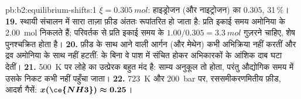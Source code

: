 \begin{solution}{pb:b2:equilibrium-shifts:1}
$\xi = \qty{0.305}{mol}$: हाइड्रोजन (और नाइट्रोजन) का 
$0.305$, 31\,\%।
\textbf{19.} स्थायी संचालन में सारा ताज़ा फ़ीड अंततः रूपांतरित हो जाता है:
प्रति इकाई समय अमोनिया के \qty{2.00}{mol} निकलते हैं; परिवर्तक से प्रति इकाई समय  के $1.00/
0.305 = \qty{3.3}{mol}$ गुज़रने चाहिए, शेष पुनश्चक्रित होता है।
\textbf{20.} फ़ीड के साथ आने वाली आर्गन (और मेथेन) कभी अभिक्रिया नहीं करतीं और
द्रव अमोनिया के साथ नहीं हटतीं:  के बिना वे
पाश में संचित होकर अभिकारकों के आंशिक दाब घटा देतीं।
\textbf{21.} \qty{500}{K} पर लोहे का उत्प्रेरक बहुत मंद है: साम्य
अनुकूल तो होता, परंतु औद्योगिक समय में उसके निकट कभी नहीं पहुँचा जाता।
\textbf{22.} \qty{723}{K} और \qty{200}{bar} पर, रससमीकरणमितीय फ़ीड, आदर्श
गैसें: $\boldsymbol{x(\ce{NH3}) \approx 0.25}$।
\end{solution}
